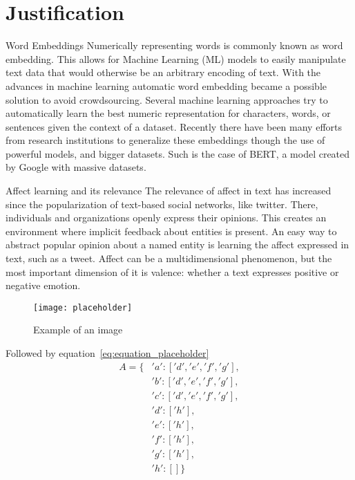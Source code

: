\section{Justification}\label{sec:Justification}

Word Embeddings
Numerically representing words is commonly known as word embedding. This allows for Machine Learning (ML) models to easily manipulate text data that would otherwise be an arbitrary encoding of text. With the advances in machine learning automatic word embedding became a possible solution to avoid crowdsourcing. %
Several machine learning approaches try to automatically learn the best numeric representation for characters, words, or sentences given the context of a dataset. Recently there have been many efforts from research institutions to generalize these embeddings though the use of powerful models, and bigger datasets. Such is the case of BERT, a model created by Google with massive datasets.

Affect learning and its relevance
The relevance of affect in text has increased since the popularization of text-based social networks, like twitter. There, individuals and organizations openly express their opinions. This creates an environment where implicit feedback about entities is present. An easy way to abstract popular opinion about a named entity is learning the affect expressed in text, such as a tweet. Affect can be a multidimensional phenomenon, but the most important dimension of it is valence: whether a text expresses positive or negative emotion.




\begin{figure}[H]
  \texttt{[image: placeholder]}
  \centering
  \caption{Example of an image}
\end{figure}\label{fig:placeholder}



Followed by equation~\ref{eq:equation_placeholder}
\begin{equation} \label{eq:equation_placeholder}
  \begin{split}
    A = \{&'a':['d','e','f','g'], \\
         &'b':['d','e','f','g'], \\
         &'c':['d','e','f','g'], \\
         &'d':['h'], \\
         &'e':['h'], \\
         &'f':['h'], \\
         &'g':['h'], \\
         &'h':[] \}
  \end{split}
\end{equation}
